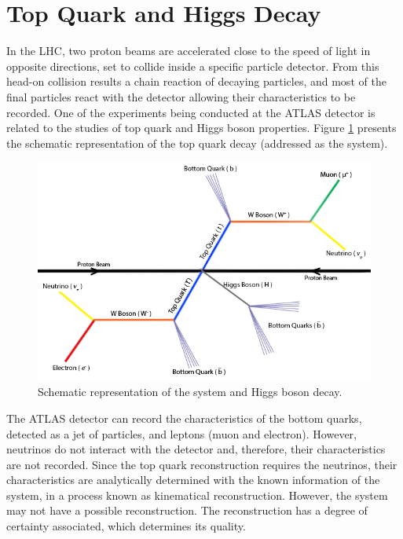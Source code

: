 \section{Top Quark and Higgs Decay}
\label{problem_and_app}

In the LHC, two proton beams are accelerated close to the speed of light in opposite directions, set to collide inside a specific particle detector. From this head-on collision results a chain reaction of decaying particles, and most of the final particles react with the detector allowing their characteristics to be recorded. One of the experiments being conducted at the ATLAS detector is related to the studies of top quark and Higgs boson properties. Figure \ref{fig:ttbar} presents the schematic representation of the top quark decay (addressed as the \ttbar system).

\begin{figure}[!htp]
	\begin{center}
		\includegraphics[scale=0.4]{images/ttbar_higgs.png}
		\caption{Schematic representation of the \ttbar system and Higgs boson decay.}
		\label{fig:ttbar}
	\end{center}
\end{figure}

The ATLAS detector can record the characteristics of the bottom quarks, detected as a jet of particles, and leptons (muon and electron). However, neutrinos do not interact with the detector and, therefore, their characteristics are not recorded. Since the top quark reconstruction requires the neutrinos, their characteristics are analytically determined with the known information of the system, in a process known as kinematical reconstruction. However, the \ttbar system may not have a possible reconstruction. The reconstruction has a degree of certainty associated, which determines its quality.

